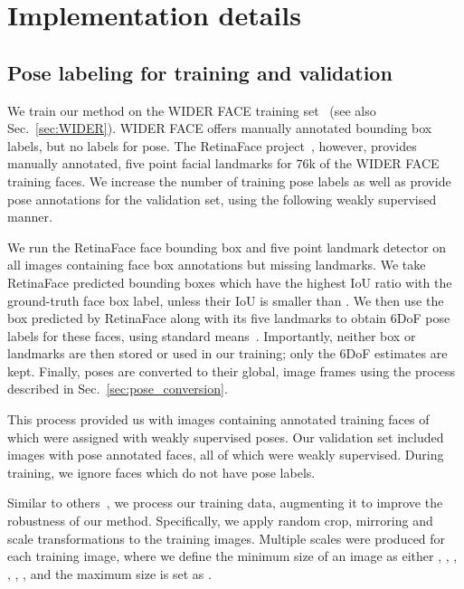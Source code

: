 \documentclass[final]{cvpr}
\newcommand{\minisection}[1]{\vspace{1mm}\noindent{\textbf{#1}.}}
\begin{document}
\section{Implementation details}
\subsection{Pose labeling for training and validation}\label{sec:trainingdata}
We train our method on the WIDER FACE training set~\cite{wider_face} (see also Sec.~\ref{sec:WIDER}). WIDER FACE offers manually annotated bounding box labels, but no labels for pose. The RetinaFace project~\cite{retinaface}, however, provides manually annotated, five point facial landmarks for 76k of the WIDER FACE training faces. We increase the number of training pose labels as well as provide pose annotations for the validation set, using the following weakly supervised manner. 


We run the RetinaFace face bounding box and five point landmark detector on all images containing face box annotations but missing landmarks. We take RetinaFace predicted bounding boxes which have the highest IoU ratio with the ground-truth face box label, unless their IoU is smaller than . We then use the box predicted by RetinaFace along with its five landmarks to obtain 6DoF pose labels for these faces, using standard means~\cite{posit, epnp}. Importantly, neither box or landmarks are then stored or used in our training; only the 6DoF estimates are kept. Finally, poses are converted to their global, image frames using the process described in Sec.~\ref{sec:pose_conversion}. 

This process provided us with  images containing  annotated training faces of which  were assigned with weakly supervised poses. Our validation set included  images with  pose annotated faces, all of which were weakly supervised. During training, we ignore faces which do not have pose labels. 



\minisection{Data augmentation} Similar to others~\cite{fdnet}, we process our training data, augmenting it to improve the robustness of our method. Specifically, we apply random crop, mirroring and scale transformations to the training images. Multiple scales were produced for each training image, where we define the minimum size of an image as either , , , , , , and the maximum size is set as . 
\end{document}
